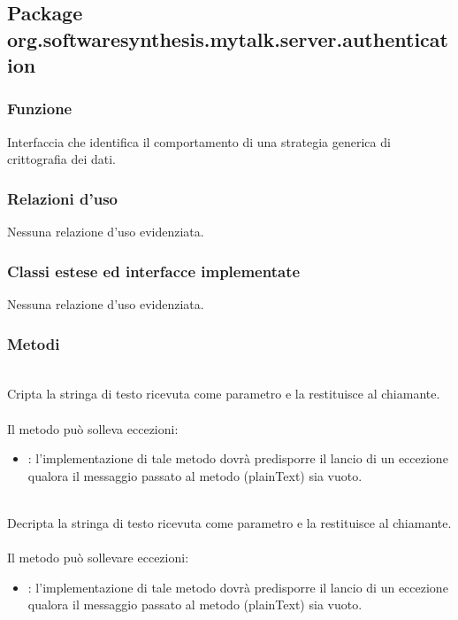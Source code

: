 \subsection{Package org.softwaresynthesis.mytalk.server.authentication}\label{sec:authentication}


\subsubsection*{Funzione}
Interfaccia che identifica il comportamento di una strategia generica di crittografia dei dati.

\subsubsection*{Relazioni d'uso}
Nessuna relazione d'uso evidenziata.

\subsubsection*{Classi estese ed interfacce implementate}

Nessuna relazione d'uso evidenziata.

\subsubsection*{Metodi}
\begin{description}
	\item{}\\
	Cripta la stringa di testo ricevuta come parametro e la restituisce al chiamante.\\\\
	Il metodo può solleva eccezioni:
	\begin{itemize}
		\item {}: l'implementazione di tale metodo dovrà predisporre il lancio di un eccezione qualora il messaggio passato al metodo (plainText) sia vuoto.
	\end{itemize}
	\item{}\\
	Decripta la stringa di testo ricevuta come parametro e la restituisce al chiamante.\\\\
	Il metodo può sollevare eccezioni:
	\begin{itemize}
		\item {}: l'implementazione di tale metodo dovrà predisporre il lancio di un eccezione qualora il messaggio passato al metodo (plainText) sia vuoto.
	\end{itemize}
\end{description}

